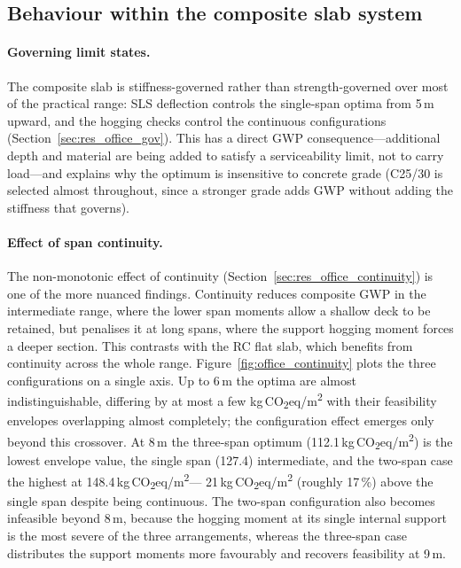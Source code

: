 \subsection{Behaviour within the composite slab system}
\label{sec:disc_within}
\paragraph{Governing limit states.} The composite slab is stiffness-governed rather than strength-governed over most of the practical range: SLS deflection controls the single-span optima from 5\,m upward, and the hogging checks control the continuous configurations (Section~\ref{sec:res_office_gov}). This has a direct GWP consequence---additional depth and material are being added to satisfy a serviceability limit, not to carry load---and explains why the optimum is insensitive to concrete grade (C25/30 is selected almost throughout, since a stronger grade adds GWP without adding the stiffness that governs).

\paragraph{Effect of span continuity.} The non-monotonic effect of continuity (Section~\ref{sec:res_office_continuity}) is one of the more nuanced findings. Continuity reduces composite GWP in the intermediate range, where the lower span moments allow a shallow deck to be retained, but penalises it at long spans, where the support hogging moment forces a deeper section. This contrasts with the RC flat slab, which benefits from continuity across the whole range. Figure~\ref{fig:office_continuity} plots the three configurations on a single axis. Up to 6\,m the optima are almost indistinguishable, differing by at most a few kg\,CO\textsubscript{2}eq/m\textsuperscript{2} with their feasibility envelopes overlapping almost completely; the configuration effect emerges only beyond this crossover. At 8\,m the three-span optimum (112.1\,kg\,CO\textsubscript{2}eq/m\textsuperscript{2}) is the lowest envelope value, the single span (127.4) intermediate, and the two-span case the highest at 148.4\,kg\,CO\textsubscript{2}eq/m\textsuperscript{2}--- 21\,kg\,CO\textsubscript{2}eq/m\textsuperscript{2} (roughly 17\,\%) above the single span despite being continuous. The two-span configuration also becomes infeasible beyond 8\,m, because the hogging moment at its single internal support is the most severe of the three arrangements, whereas the three-span case distributes the support moments more favourably and recovers feasibility at 9\,m.

